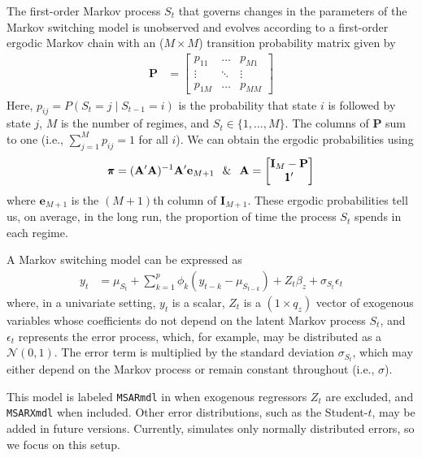 The first-order Markov process \(S_t\) that governs changes in the parameters of the Markov switching model is unobserved and evolves according to a first-order ergodic Markov chain with an (\(M \times M\)) transition probability matrix given by
\begin{align*}
    \textbf{P} & = \begin{bmatrix}
            p_{11} & \dots & p_{M1}\\
            \vdots & \ddots & \vdots \\
            p_{1M} & \dots & p_{MM}
    \end{bmatrix}
\end{align*}
Here, \(p_{ij} = P(S_t = j \mid S_{t-1} = i)\) is the probability that state \(i\) is followed by state \(j\), \(M\) is the number of regimes, and \(S_t \in \{1, \dots, M\}\). The columns of \(\mathbf{P}\) sum to one (i.e., \(\sum_{j=1}^M p_{ij} = 1\) for all \(i\)). We can obtain the ergodic probabilities using
\begin{align*}
    \pmb{\pi} = (\mathbf{A}'\mathbf{A})^{-1}\mathbf{A}'\mathbf{e}_{M+1} \hspace{0.25cm}  \&  \hspace{0.25cm} \mathbf{A} = \begin{bmatrix}
        \mathbf{I}_M-\textbf{P}\\
        \pmb{1}'
        \end{bmatrix}
\end{align*}
where \(\mathbf{e}_{M+1}\) is the \((M+1)\)th column of \(\mathbf{I}_{M+1}\). These ergodic probabilities tell us, on average, in the long run, the proportion of time the process \(S_t\) spends in each regime.

A Markov switching model can be expressed as
\begin{align}
    y_t & = \mu_{S_t} + \sum^{p}_{k=1} \phi_{k} (y_{t-k} - \mu_{S_{t-k}}) +  Z_t\beta_z + \sigma_{S_t}\epsilon_t \label{eq:msm-uni}
\end{align}
where, in a univariate setting, \(y_t\) is a scalar, \(Z_t\) is a \((1 \times q_{z})\) vector of exogenous variables whose coefficients do not depend on the latent Markov process \(S_t\), and \(\epsilon_t\) represents the error process, which, for example, may be distributed as a \(\mathcal{N}(0,1)\). The error term is multiplied by the standard deviation \(\sigma_{S_t}\), which may either depend on the Markov process or remain constant throughout (i.e., \(\sigma\)).

This model is labeled \texttt{MSARmdl} in  when exogenous regressors \(Z_t\) are excluded, and \texttt{MSARXmdl} when included. Other error distributions, such as the Student-\(t\), may be added in future versions. Currently,  simulates only normally distributed errors, so we focus on this setup.

